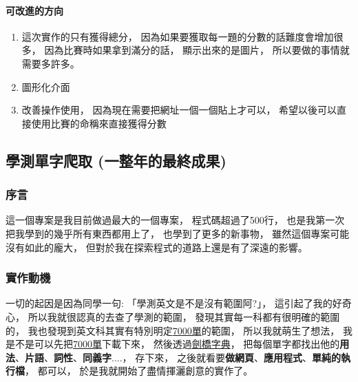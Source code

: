 \documentclass[12pt,oneside]{ctexart}
\begin{document}
\paragraph{ 可改進的方向 }
\begin{enumerate}
    \item 
        這次實作的只有獲得總分，
        因為如果要獲取每一題的分數的話難度會增加很多，
        因為比賽時如果拿到滿分的話，
        顯示出來的是圖片，
        所以要做的事情就需要多許多。
    \item
        圖形化介面
    \item
        改善操作使用，
        因為現在需要把網址一個一個貼上才可以，
        希望以後可以直接使用比賽的命稱來直接獲得分數
\end{enumerate}





\clearpage
\subsection{ 學測單字爬取 (一整年的最終成果) }
\subsubsection{序言}
這一個專案是我目前做過最大的一個專案，
程式碼超過了500行，
也是我第一次把我學到的幾乎所有東西都用上了，
也學到了更多的新事物，
雖然這個專案可能沒有如此的龐大，
但對於我在探索程式的道路上還是有了深遠的影響。


\subsubsection{ 實作動機 }
一切的起因是因為同學一句: 「學測英文是不是沒有範圍阿?」，
這引起了我的好奇心，
所以我就很認真的去查了學測的範圍，
發現其實每一科都有很明確的範圍的，
我也發現到英文科其實有特別明定\href{https://www.ceec.edu.tw/SourceUse/ce37/ce37.htm}{7000單}的範圍，
所以我就萌生了想法，
我是不是可以先把\href{https://www.ceec.edu.tw/SourceUse/ce37/ce37.htm}{7000單}下載下來，
然後透過\href{https://dictionary.cambridge.org/zht/}{劍橋字典}，
把每個單字都找出他的\textbf{用法}、\textbf{片語}、\textbf{詞性}、\textbf{同義字}....，
存下來，
之後就看要\textbf{做網頁}、\textbf{應用程式}、\textbf{單純的執行檔}，
都可以，
於是我就開始了盡情揮灑創意的實作了。
\end{document}
